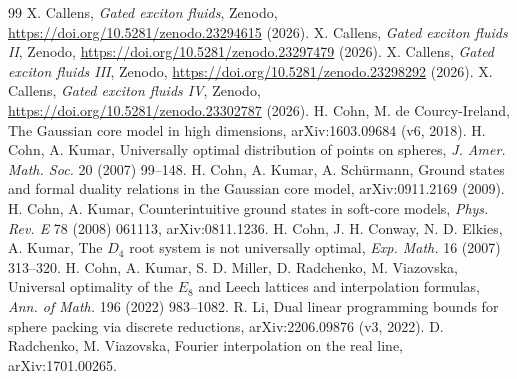 \documentclass[11pt,a4paper]{article}
\begin{document}
\begin{thebibliography}{99}\small
{} X. Callens, \emph{Gated exciton fluids}, Zenodo, \url{https://doi.org/10.5281/zenodo.23294615} (2026).
 X. Callens, \emph{Gated exciton fluids II}, Zenodo, \url{https://doi.org/10.5281/zenodo.23297479} (2026).
 X. Callens, \emph{Gated exciton fluids III}, Zenodo, \url{https://doi.org/10.5281/zenodo.23298292} (2026).
 X. Callens, \emph{Gated exciton fluids IV}, Zenodo, \url{https://doi.org/10.5281/zenodo.23302787} (2026).
 H. Cohn, M. de Courcy-Ireland, The Gaussian core model in high dimensions, arXiv:1603.09684 (v6, 2018).
 H. Cohn, A. Kumar, Universally optimal distribution of points on spheres, \emph{J. Amer. Math. Soc.} 20 (2007) 99--148.
 H. Cohn, A. Kumar, A. Sch\"urmann, Ground states and formal duality relations in the Gaussian core model, arXiv:0911.2169 (2009).
 H. Cohn, A. Kumar, Counterintuitive ground states in soft-core models, \emph{Phys. Rev. E} 78 (2008) 061113, arXiv:0811.1236.
 H. Cohn, J. H. Conway, N. D. Elkies, A. Kumar, The $D_4$ root system is not universally optimal, \emph{Exp. Math.} 16 (2007) 313--320.
 H. Cohn, A. Kumar, S. D. Miller, D. Radchenko, M. Viazovska, Universal optimality of the $E_8$ and Leech lattices and interpolation formulas, \emph{Ann. of Math.} 196 (2022) 983--1082.
 R. Li, Dual linear programming bounds for sphere packing via discrete reductions, arXiv:2206.09876 (v3, 2022).
 D. Radchenko, M. Viazovska, Fourier interpolation on the real line, arXiv:1701.00265.
\end{thebibliography}
\end{document}
